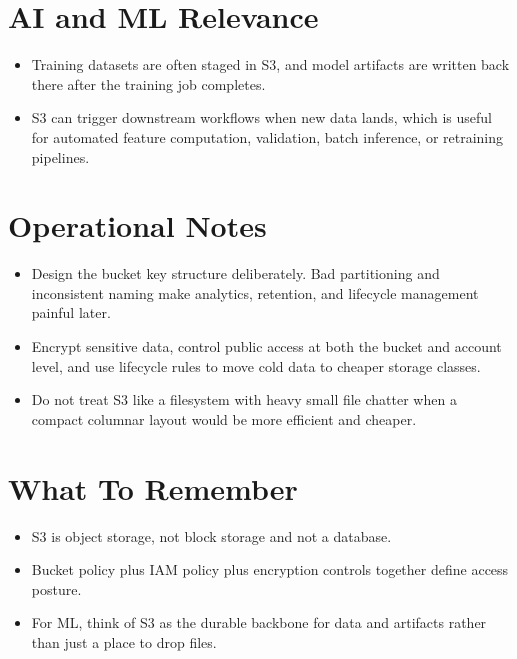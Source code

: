 \documentclass[10pt,twocolumn]{article}
\begin{document}
\section*{AI and ML Relevance}
\begin{itemize}
\item Training datasets are often staged in S3, and model artifacts are written back there after the training job completes.
\item S3 can trigger downstream workflows when new data lands, which is useful for automated feature computation, validation, batch inference, or retraining pipelines.
\end{itemize}

\section*{Operational Notes}
\begin{itemize}
\item Design the bucket key structure deliberately. Bad partitioning and inconsistent naming make analytics, retention, and lifecycle management painful later.
\item Encrypt sensitive data, control public access at both the bucket and account level, and use lifecycle rules to move cold data to cheaper storage classes.
\item Do not treat S3 like a filesystem with heavy small file chatter when a compact columnar layout would be more efficient and cheaper.
\end{itemize}

\section*{What To Remember}
\begin{itemize}
\item S3 is object storage, not block storage and not a database.
\item Bucket policy plus IAM policy plus encryption controls together define access posture.
\item For ML, think of S3 as the durable backbone for data and artifacts rather than just a place to drop files.
\end{itemize}
\end{document}
